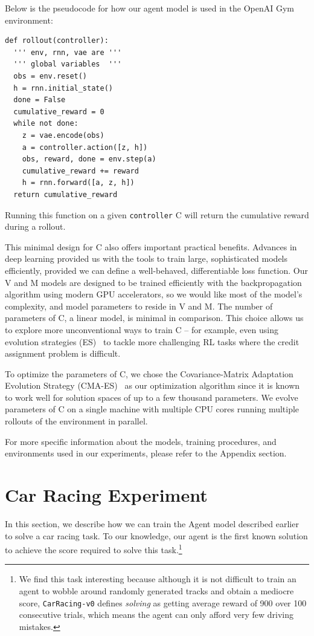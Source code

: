 \documentclass{article}
\begin{document}
Below is the pseudocode for how our agent model is used in the OpenAI Gym~\cite{openai_gym} environment:
\begin{verbatim}
def rollout(controller):
  ''' env, rnn, vae are '''
  ''' global variables  '''
  obs = env.reset()
  h = rnn.initial_state()
  done = False
  cumulative_reward = 0
  while not done:
    z = vae.encode(obs)
    a = controller.action([z, h])
    obs, reward, done = env.step(a)
    cumulative_reward += reward
    h = rnn.forward([a, z, h])
  return cumulative_reward
\end{verbatim}

Running this function on a given \texttt{controller} C will return the cumulative reward during a rollout.

This minimal design for C also offers important practical benefits. Advances in deep learning provided us with the tools to train large, sophisticated models efficiently, provided we can define a well-behaved, differentiable loss function. Our V and M models are designed to be trained efficiently with the backpropagation algorithm using modern GPU accelerators, so we would like most of the model's complexity, and model parameters to reside in V and M. The number of parameters of C, a linear model, is minimal in comparison. This choice allows us to explore more unconventional ways to train C -- for example, even using evolution strategies (ES)~\cite{Rechenberg1973,Schwefel1977} to tackle more challenging RL tasks where the credit assignment problem is difficult.

To optimize the parameters of C, we chose the Covariance-Matrix Adaptation Evolution Strategy (CMA-ES)~\cite{cmaes,cmaes_original} as our optimization algorithm since it is known to work well for solution spaces of up to a few thousand parameters. We evolve parameters of C on a single machine with multiple CPU cores running multiple rollouts of the environment in parallel.

For more specific information about the models, training procedures, and environments used in our experiments, please refer to the Appendix section.

\section{Car Racing Experiment}

In this section, we describe how we can train the Agent model described earlier to solve a car racing task. To our knowledge, our agent is the first known solution to achieve the score required to solve this task.\footnote{We find this task interesting because although it is not difficult to train an agent to wobble around randomly generated tracks and obtain a mediocre score, \texttt{CarRacing-v0} defines \textit{solving} as getting average reward of 900 over 100 consecutive trials, which means the agent can only afford very few driving mistakes.}
\end{document}
